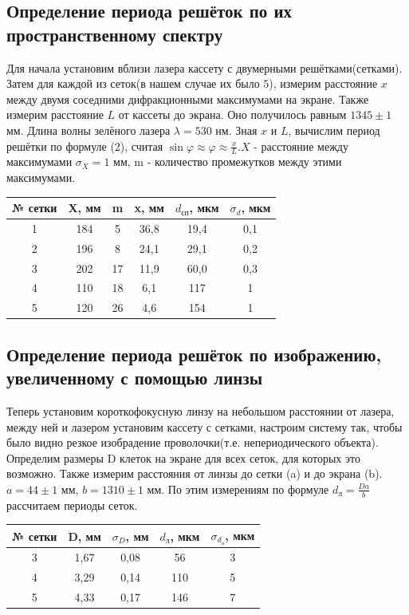 \documentclass[a4paper,12pt]{article}
\begin{document}
\subsection*{Определение периода решёток по их пространственному спектру}
Для начала установим вблизи лазера кассету с двумерными решётками(сетками). Затем для каждой из сеток(в нашем случае их было $5$), измерим расстояние $x$ между двумя соседними дифракционными максимумами на экране. Также измерим расстояние $L$ от кассеты до экрана. Оно получилось равным $1345 \pm 1$ мм. Длина волны зелёного лазера $\lambda = 530$ нм. Зная $x$ и $L$, вычислим период решётки по формуле (2), считая $\sin \varphi \approx \varphi \approx \frac{x}{L}$.$X$ - расстояние между максимумами $\sigma_X = 1$ мм, m - количество промежутков между этими максимумами.
\begin{table}[H]
	\centering
	\begin{tabular}{|c|c|c|c|c|c|}
	\hline
	№ сетки & X, мм & m & x, мм & $d_\text{сп}$, мкм & $\sigma_d$, мкм \\ \hline
	1 & 184 & 5 & 36,8 & 19,4 & 0,1 \\ \hline
	2 & 196 & 8 & 24,1 & 29,1 & 0,2 \\ \hline
	3 & 202 & 17 & 11,9 & 60,0 & 0,3 \\ \hline
	4 & 110 & 18 & 6,1 & 117 & 1 \\ \hline
	5 & 120 & 26 & 4,6 & 154 & 1 \\ \hline
	\end{tabular}
\end{table}
\subsection*{Определение периода решёток по изображению, увеличенному с помощью линзы}
Теперь установим короткофокусную линзу на небольшом расстоянии от лазера, между ней и лазером установим кассету с сетками, настроим систему так, чтобы было видно резкое изобрадение проволочки(т.е. непериодического объекта). Определим размеры D клеток на экране для всех сеток, для которых это возможно. Также измерим расстояния от линзы до сетки (a) и до экрана (b). $a = 44 \pm 1$ мм, $b = 1310 \pm 1$ мм. По этим измерениям по формуле $ d_\text{л} = \frac{Da}{b}$ рассчитаем периоды сеток.

\begin{table}[H]
	\centering
	\begin{tabular}{|c|c|c|c|c|}
	\hline
	№ сетки & D, мм & $\sigma_D$, мм & $d_\text{л}$, мкм & $\sigma_{d_\text{л}}$, мкм \\ \hline
	3 & 1,67 & 0,08 & 56 & 3 \\ \hline
	4 & 3,29 & 0,14 & 110 & 5 \\ \hline
	5 & 4,33 & 0,17 & 146 & 7 \\ \hline
	\end{tabular}
\end{table}
\end{document}
